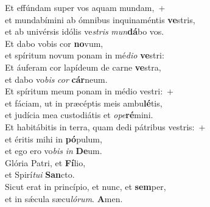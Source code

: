 \evenverse Et effúndam super vos aquam mundam,~+\\\evenverse  et mundabímini ab ómnibus inquinaméntis \textbf{ve}stris,~\*\\
\evenverse et ab univérsis idólis ve\textit{stris} \textit{mun}\textbf{dá}bo vos.\\
\oddverse Et dabo vobis cor \textbf{no}vum,~\*\\
\oddverse et spíritum novum ponam in mé\textit{di}\textit{o} \textbf{ve}stri:\\
\evenverse Et áuferam cor lapídeum de carne \textbf{ve}stra,~\*\\
\evenverse et dabo vo\textit{bis} \textit{cor} \textbf{cár}neum.\\
\oddverse Et spíritum meum ponam in médio vestri:~+\\
\oddverse  et fáciam, ut in præcéptis meis ambu\textbf{lé}tis,~\*\\
\oddverse et judícia mea custodiátis et \textit{o}\textit{pe}\textbf{ré}mini.\\
\evenverse Et habitábitis in terra, quam dedi pátribus vestris:~+\\
\evenverse  et éritis mihi in \textbf{pó}pulum,~\*\\
\evenverse et ego ero vo\textit{bis} \textit{in} \textbf{De}um.\\
\oddverse Glória Patri, et \textbf{Fí}lio,~\*\\
\oddverse et Spirí\textit{tu}\textit{i} \textbf{San}cto.\\
\evenverse Sicut erat in princípio, et nunc, et \textbf{sem}per,~\*\\
\evenverse et in sǽcula sæcu\textit{ló}\textit{rum}. \textbf{A}men.\\
